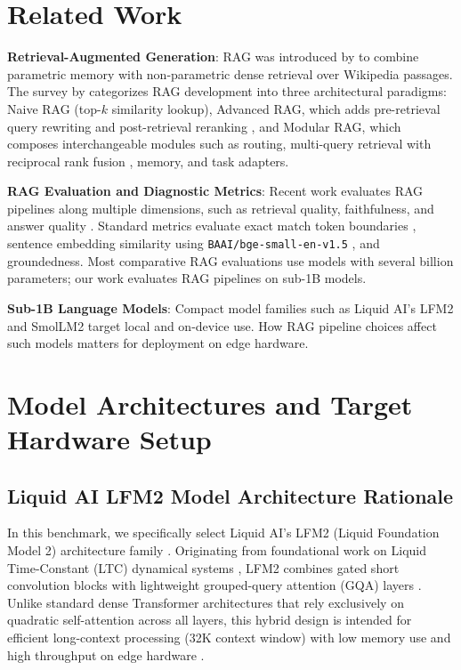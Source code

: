 \documentclass[10pt]{article}
\begin{document}
\section{Related Work}
\label{sec:related}

\textbf{Retrieval-Augmented Generation}: RAG was introduced by \citet{lewis2020retrieval} to combine parametric memory with non-parametric dense retrieval over Wikipedia passages. The survey by \citet{gao2023retrieval} categorizes RAG development into three architectural paradigms: Naive RAG (top-$k$ similarity lookup), Advanced RAG, which adds pre-retrieval query rewriting \citep{ma2023query} and post-retrieval reranking \citep{nogueira2019passage}, and Modular RAG, which composes interchangeable modules such as routing, multi-query retrieval with reciprocal rank fusion \citep{cormack2009reciprocal}, memory, and task adapters.

\textbf{RAG Evaluation and Diagnostic Metrics}: Recent work evaluates RAG pipelines along multiple dimensions, such as retrieval quality, faithfulness, and answer quality \citep{asai2023self, li2024retrieval}. Standard metrics evaluate exact match token boundaries \citep{rajpurkar2016squad}, sentence embedding similarity using \texttt{BAAI/bge-small-en-v1.5} \citep{reimers2019sentence, bge2023embedding}, and groundedness. Most comparative RAG evaluations use models with several billion parameters; our work evaluates RAG pipelines on sub-1B models.

\textbf{Sub-1B Language Models}: Compact model families such as Liquid AI's LFM2 \citep{liquid2024lfm} and SmolLM2 \citep{allal2025smollm2} target local and on-device use. How RAG pipeline choices affect such models matters for deployment on edge hardware.

\section{Model Architectures and Target Hardware Setup}
\label{sec:models}

\subsection{Liquid AI LFM2 Model Architecture Rationale}
In this benchmark, we specifically select Liquid AI's LFM2 (Liquid Foundation Model 2) architecture family \citep{liquid2024lfm}. Originating from foundational work on Liquid Time-Constant (LTC) dynamical systems \citep{hasani2020liquid}, LFM2 combines gated short convolution blocks with lightweight grouped-query attention (GQA) layers \citep{liquid2024lfm}. Unlike standard dense Transformer architectures that rely exclusively on quadratic self-attention across all layers, this hybrid design is intended for efficient long-context processing (32K context window) with low memory use and high throughput on edge hardware \citep{liquid2024lfm}.
\end{document}
